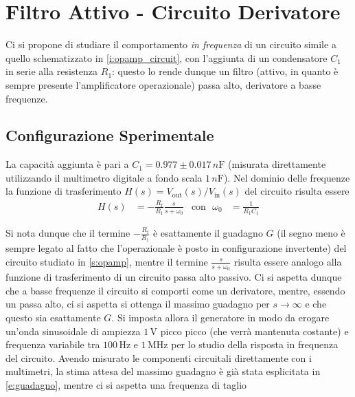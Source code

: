 \documentclass[a4paper,11pt]{article} %
\begin{document}
\section{Filtro Attivo - Circuito Derivatore}
Ci si propone di studiare il comportamento \textit{in frequenza} di un circuito simile a quello schematizzato in
\autoref{i:opamp_circuit}, con l'aggiunta di un condensatore $C_{1}$ in serie alla resistenza $R_{1}$: questo lo rende
dunque un filtro (attivo, in quanto è sempre presente l'amplificatore operazionale) passa alto, derivatore a basse
frequenze. 


\subsection{Configurazione Sperimentale}
La capacità aggiunta è pari a $C_{1} = 0.977 \pm 0.017 \,\si{n\farad}$ (misurata direttamente utilizzando il multimetro
digitale a fondo scala $1\,\si{n\farad}$). Nel dominio delle frequenze la funzione di trasferimento
$H(s)=V_{\text{out}}(s)/V_{\text{in}}(s)$ del circuito risulta essere 
\begin{align}
	H(s) &= -\frac{R_{\text{f}}}{R_{1}}\frac{s}{s+\omega_{0}} & \text{con}\,\,\,\, \omega_{0}&=\frac{1}{R_{1}C_{1}}
\end{align}

\noindent Si nota dunque che il termine $-\frac{R_{\text{f}}}{R_{1}}$ è esattamente il guadagno $G$ (il segno meno è
sempre legato al fatto che l'operazionale è posto in configurazione invertente) del circuito studiato in
\autoref{s:opamp}, mentre il termine $\frac{s}{s+\omega_{0}}$ risulta essere analogo alla funzione di trasferimento di
un circuito passa alto passivo. Ci si aspetta dunque che a basse frequenze il circuito si comporti come un derivatore,
mentre, essendo un passa alto, ci si aspetta si ottenga il massimo guadagno per $s\rightarrow\infty$ e che questo sia
esattamente $G$. Si imposta allora il generatore in modo da erogare un'onda sinusoidale di ampiezza $1\,\si{\volt}$
picco picco (che verrà mantenuta costante) e frequenza variabile tra $100\,\si{\Hz}$ e $1\,\si{\MHz}$ per lo studio
della risposta in frequenza del circuito. Avendo misurato le componenti circuitali direttamente con i multimetri, la
stima attesa del massimo guadagno è già stata esplicitata in \autoref{e:guadagno}, mentre ci si aspetta una frequenza di
taglio
\end{document}
